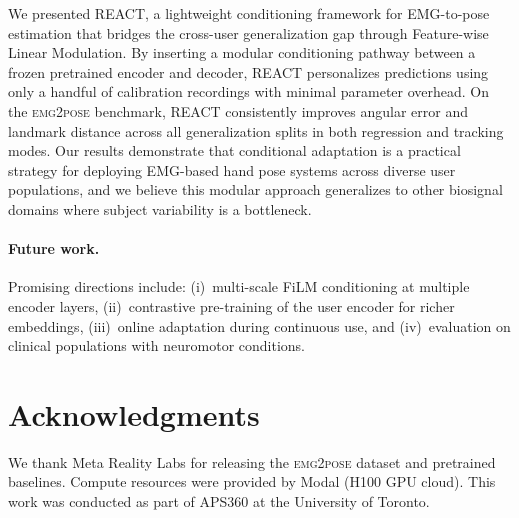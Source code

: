 \documentclass[10pt]{article}
\begin{document}
We presented REACT, a lightweight conditioning framework for EMG-to-pose estimation that bridges the cross-user generalization gap through Feature-wise Linear Modulation. By inserting a modular conditioning pathway between a frozen pretrained encoder and decoder, REACT personalizes predictions using only a handful of calibration recordings with minimal parameter overhead. On the \textsc{emg2pose} benchmark, REACT consistently improves angular error and landmark distance across all generalization splits in both regression and tracking modes. Our results demonstrate that conditional adaptation is a practical strategy for deploying EMG-based hand pose systems across diverse user populations, and we believe this modular approach generalizes to other biosignal domains where subject variability is a bottleneck.

\paragraph{Future work.}
Promising directions include: (i)~multi-scale FiLM conditioning at multiple encoder layers, (ii)~contrastive pre-training of the user encoder for richer embeddings, (iii)~online adaptation during continuous use, and (iv)~evaluation on clinical populations with neuromotor conditions.

\section*{Acknowledgments}

We thank Meta Reality Labs for releasing the \textsc{emg2pose} dataset and pretrained baselines. Compute resources were provided by Modal (H100 GPU cloud). This work was conducted as part of APS360 at the University of Toronto.
\end{document}

